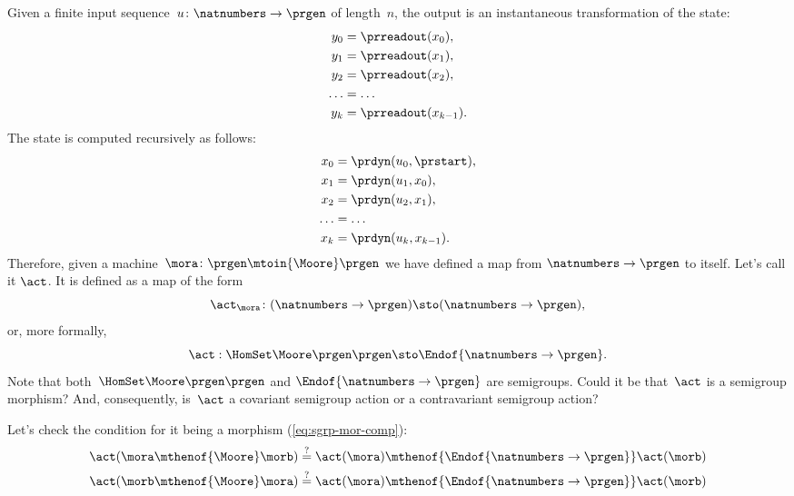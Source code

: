 Given a finite input sequence~$u\colon \natnumbers \to \prgen$ of length~$n$, the output is an instantaneous transformation of the state:
%
\begin{equation}
	\label{eq:actions-on-sequences-y}
	\begin{aligned}
		y_0   & = \prreadout(x_0),     \\
		y_1   & = \prreadout(x_1),     \\
		y_2   & = \prreadout(x_2),     \\
		\dots & = \dots                \\
		y_{k} & = \prreadout(x_{k-1}).
	\end{aligned}
\end{equation}
%
The state is computed recursively as follows:
\begin{equation}
	\label{eq:actions-on-sequences-x}
	\begin{aligned}
		x_0   & = \prdyn(u_0, \prstart),  \\
		x_1   & = \prdyn(u_1, x_0),       \\
		x_2   & = \prdyn(u_2, x_1),       \\
		\dots & = \dots                   \\
		x_{k} & = \prdyn(u_{k}, x_{k-1}).
	\end{aligned}
\end{equation}
%
Therefore, given a machine~$\mora \colon \prgen \mtoin{\Moore} \prgen$ we have defined a map from $\natnumbers \to \prgen$ to itself.
Let's call it $\act$.
It is defined as a map of the form
%
\begin{equation}
	\label{eq:actions-on-sequences-1}
	\act_{\mora}\colon  (\natnumbers \to \prgen)  \sto  (\natnumbers \to \prgen),
\end{equation}
%
or, more formally,
%
\begin{equation}
	\label{eq:actions-on-sequences-2}
	\act: \HomSet\Moore\prgen\prgen \sto \Endof {\natnumbers \to \prgen}.
\end{equation}
%
Note that both~$\HomSet\Moore\prgen\prgen$ and $\Endof {\natnumbers \to \prgen}$ are semigroups.
Could it be that~$\act$ is a semigroup morphism?
And, consequently, is~$\act$ a covariant semigroup action or a contravariant semigroup action?

Let's check the condition for it being a morphism (\cref{eq:sgrp-mor-comp}):
%
\begin{align}
	\act ( \mora \mthenof{\Moore} \morb) & \mathrel{\stackrel{?
	}{=} } \act ( \mora) \mthenof{\Endof  {\natnumbers \to \prgen}} \act(\morb) \label{eq:actions-on-sequences-left}                                                             \\
	\act ( \morb \mthenof{\Moore} \mora) & \mathrel{\stackrel{?}{=}}  \act ( \mora) \mthenof{\Endof  {\natnumbers \to \prgen}} \act(\morb) \label{eq:actions-on-sequences-right}
\end{align}

